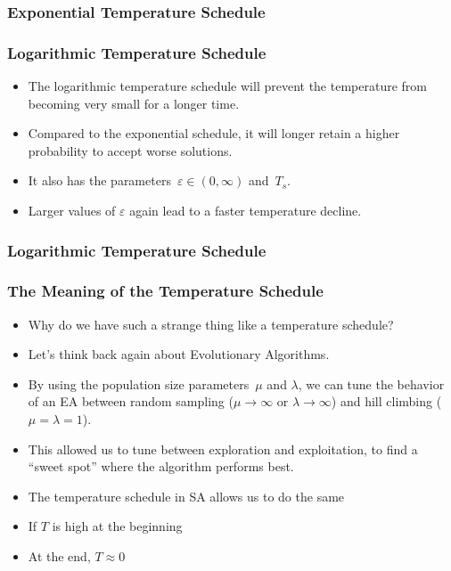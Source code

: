 \documentclass[mathserif]{beamer}%
\begin{document}
%
\begin{frame}%
\frametitle{Exponential Temperature Schedule}%
\end{frame}%
%
%
\setcounter{eqLogarithmic}{\value{equation}}%
\setcounter{eqLast}{\value{equation}}%
%
\begin{frame}%
\frametitle{Logarithmic Temperature Schedule}%
\begin{itemize}%
\item The \alert{logarithmic temperature schedule} will prevent the temperature from becoming very small for a longer time.%
\item<2-> Compared to the exponential schedule, it will longer retain a higher probability to accept worse solutions.%
\item<3-> It also has the parameters~$\varepsilon\in(0,\infty)$ and~$T_s$.
%
\item<5-> Larger values of $\varepsilon$ again lead to a faster temperature decline.%
\end{itemize}%
\end{frame}%
%
\setcounter{eqLast}{\value{equation}}%
%
\begin{frame}%
\frametitle{Logarithmic Temperature Schedule}%
\end{frame}%
%
\begin{frame}%
\frametitle{The Meaning of the Temperature Schedule}%
\begin{itemize}%
\item Why do we have such a strange thing like a temperature schedule?%
\item<2-> Let's think back again about Evolutionary Algorithms\cite{WGOEB,H1975GA,BFM1997EA,MF2004HTSIMH,G1989GA}.%
\item<3-> By using the population size parameters~$\mu$ and $\lambda$, we can tune the behavior of an EA between random sampling ($\mu\rightarrow\infty$ or $\lambda\rightarrow\infty$) and hill climbing ($\mu=\lambda=1$).%
\item<4-> This allowed us to tune between exploration and exploitation, to find a ``sweet spot'' where the algorithm performs best.%
\item<5-> The temperature schedule in SA allows us to do the same%
\item<7-> If $T$ is high at the beginning%
\item<10-> At the end, $T\approx 0$%
\end{itemize}%
\end{frame}%
%
\end{document}
